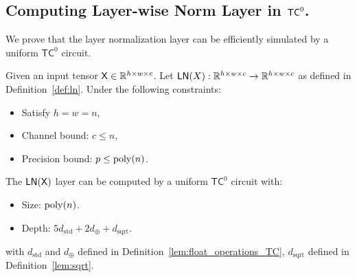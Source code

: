 \subsection{Computing Layer-wise Norm Layer in \texorpdfstring{$\mathsf{TC}^0$}{}.}\label{sec:ln_tc0}
We prove that the layer normalization layer can be efficiently simulated by a uniform $\mathsf{TC}^0$ circuit.
\begin{lemma}\label{lem:ln_tc0_informal}
    Given an input tensor $\mathsf{X} \in \mathbb{R}^{h \times w \times c}$. Let $\mathsf{LN}(X):\mathbb{R}^{h \times w \times c} \to \mathbb{R}^{h \times w \times c}$ as defined in Definition~\ref{def:ln}. Under the following constraints:
    \begin{itemize}
         \item Satisfy $h = w = n$,
         \item Channel bound: $c \leq n$,
         \item Precision bound: $p \leq \operatorname{poly}(n)$.
     \end{itemize}
     The $\mathsf{LN}(\mathsf{X})$ layer can be computed by a uniform $\mathsf{TC}^0$ circuit with:
     \begin{itemize}
        \item Size: $\operatorname{poly}(n)$.
        \item Depth: $5d_\mathrm{std} + 2d_{\oplus} + d_\mathrm{sqrt}$.
     \end{itemize}    
     with $d_{\mathrm{std}}$ and $d_{\oplus}$ defined in Definition~\ref{lem:float_operations_TC}, $d_{\mathrm{sqrt}}$ defined in Definition~\ref{lem:sqrt}.
\end{lemma}


